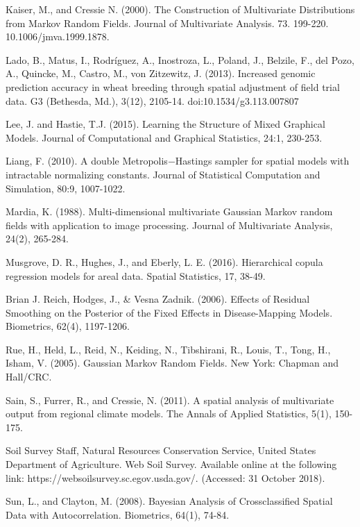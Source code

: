 \documentclass[12pt, a4paper, twoside]{article}
\begin{document}
\begin{thebibliography}{9}
	 Kaiser, M., and Cressie N. (2000). The Construction of Multivariate Distributions from Markov Random Fields.  Journal of Multivariate Analysis. 73. 199-220. 10.1006/jmva.1999.1878.
	
	 Lado, B., Matus, I., Rodríguez, A., Inostroza, L., Poland, J., Belzile, F., del Pozo, A., Quincke, M., Castro, M., von Zitzewitz, J. (2013). Increased genomic prediction accuracy in wheat breeding through spatial adjustment of field trial data. G3 (Bethesda, Md.), 3(12), 2105-14. doi:10.1534/g3.113.007807
	
	 Lee, J. and Hastie, T.J. (2015). Learning the Structure of Mixed Graphical Models. Journal of Computational and Graphical Statistics, 24:1, 230-253.
	
	  Liang, F. (2010). A double Metropolis$-$Hastings sampler for spatial models with intractable normalizing constants. Journal of Statistical Computation and Simulation, 80:9, 1007-1022.
	
	 Mardia, K. (1988). Multi-dimensional multivariate Gaussian Markov random fields with application to image processing. Journal of Multivariate Analysis, 24(2), 265-284.
	
	 Musgrove, D. R., Hughes, J., and Eberly, L. E. (2016). Hierarchical copula regression models for areal data. Spatial Statistics, 17, 38-49.
	
	 Brian J. Reich, Hodges, J., \& Vesna Zadnik. (2006). Effects of Residual Smoothing on the Posterior of the Fixed Effects in Disease-Mapping Models. Biometrics, 62(4), 1197-1206.
	
	 Rue, H., Held, L., Reid, N., Keiding, N., Tibshirani, R., Louis, T., Tong, H., Isham, V. (2005). Gaussian Markov Random Fields. New York: Chapman and Hall/CRC.
	
	 Sain, S., Furrer, R., and Cressie, N. (2011). A spatial analysis of multivariate output from regional climate models. The Annals of Applied Statistics, 5(1), 150-175.
	
	 Soil Survey Staff, Natural Resources Conservation Service, United States Department of Agriculture. Web Soil Survey. Available online at the following link: https://websoilsurvey.sc.egov.usda.gov/. (Accessed: 31 October 2018).
	
	 Sun, L., and Clayton, M. (2008). Bayesian Analysis of Crossclassified Spatial Data with Autocorrelation. Biometrics, 64(1), 74-84. 
	

\end{thebibliography}
\end{document}
